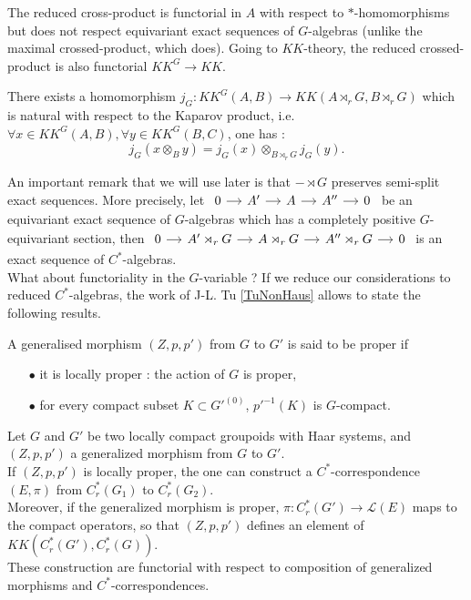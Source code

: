 The reduced cross-product is functorial in $A$ with respect to $*$-homomorphisms but does not respect equivariant exact sequences of $G$-algebras (unlike the maximal crossed-product, which does). Going to $KK$-theory, the reduced crossed-product is also functorial $KK^G\rightarrow KK$.\\

\begin{prop}
There exists a homomorphism $j_G : KK^{G}(A,B)\rightarrow KK(A\rtimes_r G,B\rtimes_r G)$ which is natural with respect to the Kaparov product, i.e. $\forall x\in KK^G(A,B),\forall y\in KK^G(B,C)$, one has :
\[j_G(x\otimes_B y ) = j_G(x)\otimes_{B\rtimes_r G} j_G(y).\]
\end{prop}

An important remark that we will use later is that $- \rtimes G$ preserves semi-split exact sequences. More precisely, let 
$\begin{tikzcd}[column sep = small]
0\arrow{r} &  A'\arrow{r} &  A \arrow{r} &  A'' \arrow{r} & 0
\end{tikzcd}$
be an equivariant exact sequence of $G$-algebras which has a completely positive $G$-equivariant section, then
$\begin{tikzcd}[column sep = small]
0\arrow{r} &  A'\rtimes_r G \arrow{r} &  A\rtimes_r G \arrow{r} &  A''\rtimes_r G \arrow{r} & 0
\end{tikzcd}$ is an exact sequence of $C^*$-algebras.\\

What about functoriality in the $G$-variable ? If we reduce our considerations to reduced $C^*$-algebras, the work of J-L. Tu \ref{TuNonHaus} allows to state the following results.\\

\begin{definition}
A generalised morphism $(Z,p,p')$ from $G$ to $G'$ is said to be proper if 
\begin{itemize}
\item[$\bullet$] it is locally proper : the action of $G$ is proper,
\item[$\bullet$] for every compact subset $K\subset G'^{(0)}$, $p'^{-1}(K)$ is $G$-compact.
\end{itemize}
\end{definition}

\begin{prop}
Let $G$ and $G'$ be two locally compact groupoids with Haar systems, and $(Z,p,p')$ a generalized morphism from $G$ to $G'$. \\
If $(Z,p,p')$ is locally proper, the one can construct a $C^*$-correspondence $(E,\pi)$ from $C_r^*(G_1)$ to $C^*_r(G_2)$. \\
Moreover, if the generalized morphism is proper, $\pi : C^*_r(G')\rightarrow \mathcal L(E)$ maps to the compact operators, so that $(Z,p,p')$ defines an element of $KK(C_r^*(G'),C_r^*(G))$.\\
These construction are functorial with respect to composition of generalized morphisms and $C^*$-correspondences.\\ 
\end{prop}


